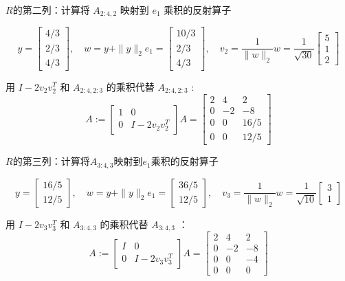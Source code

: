\begin{problem}
$R$的第二列：计算将 $ A_{2: 4,2} $ 映射到 $ e_{1} $ 乘积的反射算子

$$y=\left[\begin{array}{l}
    4 / 3 \\
    2 / 3 \\
    4 / 3
    \end{array}\right], \quad w=y+\|y\|_{2} e_{1}=\left[\begin{array}{r}
    10 / 3 \\
    2 / 3 \\
    4 / 3
    \end{array}\right], \quad v_{2}=\frac{1}{\|w\|_{2}} w=\frac{1}{\sqrt{30}}\left[\begin{array}{l}
    5 \\
    1 \\
    2
    \end{array}\right]
$$

用 $I-2 v_{2} v_{2}^{T}$ 和 $A_{2: 4,2: 3}$ 的乘积代替 $A_{2: 4,2: 3}$ :
$$
A:=\left[\begin{array}{cc}
1 & 0 \\
0 & I-2 v_{2} v_{2}^{T}
\end{array}\right] A=\left[\begin{array}{rrr}
2 & 4 & 2 \\
0 & -2 & -8 \\
0 & 0 & 16 / 5 \\
0 & 0 & 12 / 5
\end{array}\right]
$$

$R$的第三列：计算将$ A_{3: 4,3} $映射到$e_1$乘积的反射算子

$$y=\left[\begin{array}{l}
    16 / 5 \\
    12 / 5
    \end{array}\right], \quad w=y+\|y\|_{2} e_{1}=\left[\begin{array}{c}
    36 / 5 \\
    12 / 5
    \end{array}\right], \quad v_{3}=\frac{1}{\|w\|_{2}} w=\frac{1}{\sqrt{10}}\left[\begin{array}{l}
    3 \\
    1
    \end{array}\right]
$$

用 $I-2 v_{3} v_{3}^{T}$ 和 $A_{3: 4,3}$ 的乘积代替 $A_{3: 4,3}$ ：
$$
A:=\left[\begin{array}{cc}
I & 0 \\
0 & I-2 v_{3} v_{3}^{T}
\end{array}\right] A=\left[\begin{array}{rrr}
2 & 4 & 2 \\
0 & -2 & -8 \\
0 & 0 & -4 \\
0 & 0 & 0
\end{array}\right]
$$



\end{problem}
